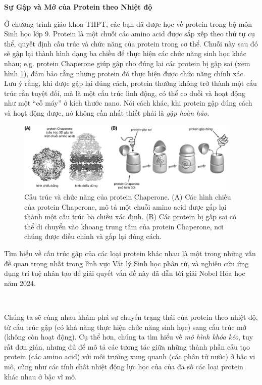 \textbf{Sự Gập và Mở của Protein theo Nhiệt độ}

Ở chương trình giáo khoa THPT, các bạn đã được học về protein trong bộ môn Sinh học lớp 9. Protein là một chuỗi các amino acid được sắp xếp theo thứ tự cụ thể, quyết định cấu trúc và chức năng của protein trong cơ thể. Chuỗi này sau đó sẽ gập lại thành hình dạng ba chiều để thực hiện các chức năng sinh học khác nhau; e.g. protein Chaperone giúp gập cho đúng lại các protein bị gập sai (xem hình \ref{fig:Chaperone}), đảm bảo rằng những protein đó thực hiện được chức năng chính xác. Lưu ý rằng, khi được gập lại đúng cách, protein thường không trở thành một cấu trúc rắn tuyệt đối, mà là một cấu trúc linh động, có thể co duỗi và hoạt động như một ``cỗ máy'' ở kích thước nano. Nói cách khác, khi protein gập đúng cách và hoạt động được, nó không cần nhất thiết phải là \textit{gập hoàn hảo}.

\begin{figure}[!h]
    \centering\includegraphics[width=0.96\textwidth]{Problem_2/Figs_P2/fig01.png}\caption{Cấu trúc và chức năng của protein Chaperone. (A) Các hình chiếu của protein Chaperone, mô tả một chuỗi amino acid được gấp lại thành một cấu trúc ba chiều xác định. (B) Các protein bị gấp sai có thể di chuyển vào khoang trung tâm của protein Chaperone, nơi chúng được điều chỉnh và gấp lại đúng cách.}
    \label{fig:Chaperone}
\end{figure}

Tìm hiểu về cấu trúc gập của các loại protein khác nhau là một trong những vấn đề quan trọng nhất trong lĩnh vực Vật lý Sinh học phân tử, và nghiên cứu ứng dụng trí tuệ nhân tạo để giải quyết vấn đề này đã dẫn tới giải Nobel Hóa học năm 2024.

\ \ 

Chúng ta sẽ cùng nhau khám phá sự chuyển trạng thái của protein theo nhiệt độ, từ cấu trúc gập (có khả năng thực hiện chức năng sinh học) sang cấu trúc mở (không còn hoạt động). Cụ thể hơn, chúng ta tìm hiểu về \textit{mô hình khóa kéo}, tuy rất đơn giản, nhưng đủ để mô tả các tương tác giữa những thành phần cấu tạo protein (các amino acid) với môi trường xung quanh (các phân tử nước) ở bậc vi mô, cũng như các tính chất nhiệt động lực học của của đa số các loại protein khác nhau ở bậc vĩ mô.

